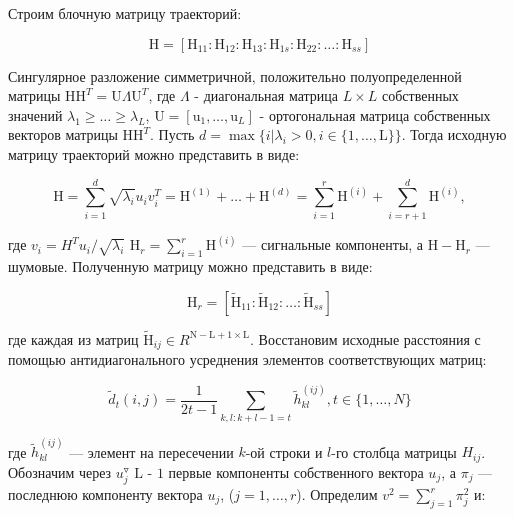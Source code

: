 \documentclass{article}
\begin{document}
Строим блочную матрицу траекторий:

\begin{equation}
    \text{H} = [\text{H}_{11} : \text{H}_{12} : \text{H}_{13} : \text{H}_{1s} : \text{H}_{22} : \ldots : \text{H}_{ss}]
\end{equation}

Сингулярное разложение симметричной, положительно полуопределенной матрицы $\text{HH}^T = \text{U}\Lambda\text{U}^T$, где $\Lambda$ - диагональная матрица $L \times L$ собственных значений $\lambda_1 \geq \ldots \geq \lambda_L$, $\text{U} = [\text{u}_1, \ldots, \text{u}_L]$ - ортогональная матрица собственных векторов матрицы $\text{HH}^T$. Пусть $d = \max\{i|\lambda_i > 0, i \in \{1, \ldots, \text{L}\}\}$. Тогда исходную матрицу траекторий можно представить в виде:

\begin{equation}
    \text{H} = \sum\limits_{i = 1}^d\sqrt{\lambda_i}u_iv_i^T = \text{H}^{(1)} + \ldots + \text{H}^{(d)} = \sum\limits_{i = 1}^r \text{H}^{(i)} + \sum\limits_{i = r + 1}^d \text{H}^{(i)},
\end{equation}

 где $v_i = H^Tu_i/\sqrt{\lambda_i}$ $\text{H}_r = \sum\limits_{i = 1}^{r} \text{H}^{(i)}$ --- сигнальные компоненты, а $\text{H} - \text{H}_r$ --- 
шумовые. Полученную матрицу можно представить в виде:

\begin{equation}
    \text{H}_r = [ \widetilde{\text{H}}_{11} : \widetilde{\text{H}}_{12} : \ldots : \widetilde{\text{H}}_{ss}]
\end{equation}

где каждая из матриц $\widetilde{\text{H}}_{ij} \in R^{\text{N} - \text{L} + 1 \times \text{L}}$. Восстановим исходные расстояния с помощью антидиагонального усреднения элементов соответствующих матриц:

\begin{equation}
    \widetilde{d}_t(i, j) = \dfrac{1}{2t - 1} \sum\limits_{k, l: k + l - 1 = t} \widetilde{h}^{(ij)}_{kl}, t \in \{1, \ldots, N\}
\end{equation}

где $\widetilde{h}^{(ij)}_{kl}$ --- элемент на пересечении $k$-ой строки и $l$-го столбца матрицы $H_{ij}$. Обозначим через $u^{\triangledown}_j$ $\text{L - 1}$ первые компоненты собственного вектора $u_j$, а $\pi_j$ --- последнюю компоненту вектора $u_j$, ($j = 1, \ldots, r$). Определим $v^2 = \sum\limits_{j = 1}^r \pi_{j}^2$ и:
\end{document}
